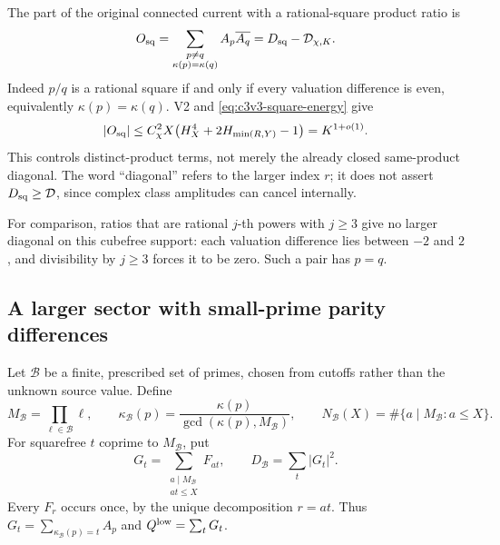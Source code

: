 \documentclass[11pt]{article}
\theoremstyle{remark}
\begin{document}
The part of the original connected current with a rational-square
product ratio is
\begin{equation}
 O_{\rm sq}=\sum_{\substack{p\ne q\\\kappa(p)=\kappa(q)}}
                       A_p\overline{A_q}=D_{\rm sq}-\mathcal D_{\chi,K}.
 \label{eq:c3v3-square-connected}
\end{equation}
Indeed \(p/q\) is a rational square if and only if every valuation
difference is even, equivalently \(\kappa(p)=\kappa(q)\).
V2 and \eqref{eq:c3v3-square-energy} give
\begin{equation}
 |O_{\rm sq}|\le C_\chi^2 X
              \bigl(H_X^4+2H_{\min(R,Y)}-1\bigr)=K^{1+o(1)}.
 \label{eq:c3v3-square-connected-bound}
\end{equation}
This controls distinct-product terms, not merely the already closed
same-product diagonal.  The word ``diagonal'' refers to the larger
index \(r\); it does not assert \(D_{\rm sq}\ge\mathcal D\),
since complex class amplitudes can cancel internally.

For comparison, ratios that are rational \(j\)-th powers with
\(j\ge3\) give no larger diagonal on this cubefree support: each
valuation difference lies between \(-2\) and \(2\), and divisibility
by \(j\ge3\) forces it to be zero.  Such a pair has \(p=q\).

\subsection{A larger sector with small-prime parity differences}

Let \(\mathcal B\) be a finite, prescribed set of primes, chosen
from cutoffs rather than the unknown source value.  Define
\[
 M_{\mathcal B}=\prod_{\ell\in\mathcal B}\ell,\qquad
 \kappa_{\mathcal B}(p)
       =\frac{\kappa(p)}{\gcd(\kappa(p),M_{\mathcal B})},\qquad
 N_{\mathcal B}(X)=\#\{a\mid M_{\mathcal B}:a\le X\}.
\]
For squarefree \(t\) coprime to \(M_{\mathcal B}\), put
\begin{equation}
 G_t=\sum_{\substack{a\mid M_{\mathcal B}\\at\le X}}F_{at},
 \qquad D_{\mathcal B}=\sum_t|G_t|^2.
 \label{eq:c3v3-coarse-classes}
\end{equation}
Every \(F_r\) occurs once, by the unique decomposition
\(r=at\).  Thus \(G_t=\sum_{\kappa_{\mathcal B}(p)=t}A_p\)
and \(Q^{\rm low}=\sum_tG_t\).
\end{document}
